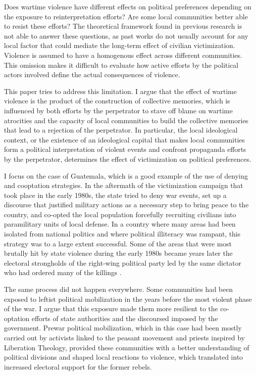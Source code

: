\documentclass[12pt, notitlepage]{article}
\begin{document}
Does wartime violence have different effects on political preferences depending on the exposure to reinterpretation efforts?
Are some local communities better able to resist these efforts?
The theoretical framework found in previous research is not able to answer these questions, as past works do not usually account for any local factor that could mediate the long-term effect of civilian victimization.
Violence is assumed to have a homogenous effect across different communities.
This omission makes it difficult to evaluate how active efforts by the political actors involved define the actual consequences of violence.

This paper tries to address this limitation.
I argue that the effect of wartime violence is the product of the construction of collective memories, which is influenced by both efforts by the perpetrator to stave off blame on wartime atrocities and the capacity of local communities to build the collective memories that lead to a rejection of the perpetrator.
In particular, the local ideological context, or the existence of an ideological capital that makes local communities form a political interpretation of violent events and confront propaganda efforts by the perpetrator, determines the effect of victimization on political preferences.

I focus on the case of Guatemala, which is a good example of the use of denying and cooptation strategies.
In the aftermath of the victimization campaign that took place in the early 1980s, the state tried to deny war events, set up a discourse that justified military actions as a necessary step to bring peace to the country, and co-opted the local population forcefully recruiting civilians into paramilitary units of local defense.
In a country where many areas had been isolated from national politics and where political illiteracy was rampant, this strategy was to a large extent successful.
Some of the areas that were most brutally hit by state violence during the early 1980s became years later the electoral strongholds of the right-wing political party led by the same dictator who had ordered many of the killings \citep{Ball:1999ab}.

The same process did not happen everywhere.
Some communities had been exposed to leftist political mobilization in the years before the most violent phase of the war.
I argue that this exposure made them more resilient to the co-optation efforts of state authorities and the discoursed imposed by the government.
Prewar political mobilization, which in this case had been mostly carried out by activists linked to the peasant movement and priests inspired by Liberation Theology, provided these communities with a better understanding of political divisions and shaped local reactions to violence, which translated into increased electoral support for the former rebels.
\end{document}
